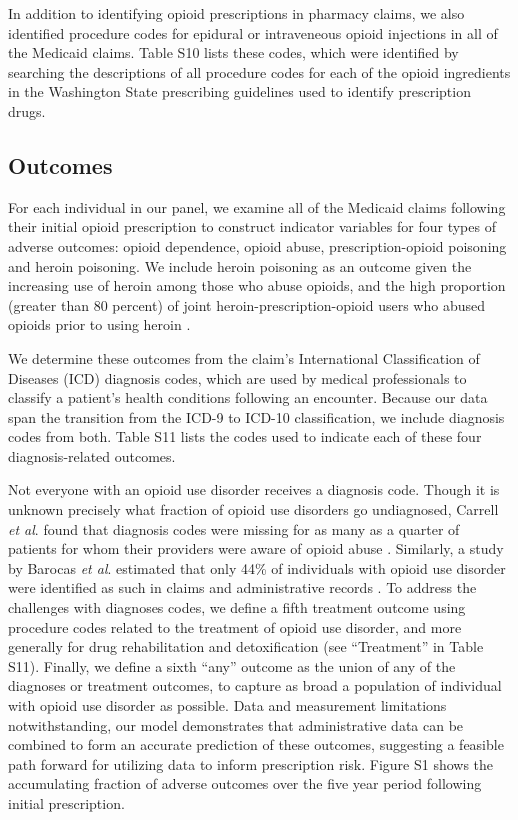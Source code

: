 \documentclass[9pt,twoside]{pnas-new}
\begin{document}
In addition to identifying opioid prescriptions in pharmacy claims, we also identified procedure codes for epidural or intraveneous opioid injections in all of the Medicaid claims. Table S10 lists these codes, which were identified by searching the descriptions of all procedure codes for each of the opioid ingredients in the Washington State prescribing guidelines used to identify prescription drugs.

\subsection{Outcomes}

For each individual in our panel, we examine all of the Medicaid claims following their initial opioid prescription to construct indicator variables for four types of adverse outcomes: opioid dependence, opioid abuse, prescription-opioid poisoning and heroin poisoning. We include heroin poisoning as an outcome given the increasing use of heroin among those who abuse opioids, and the high proportion (greater than 80 percent) of joint heroin-prescription-opioid users who abused opioids prior to using heroin \cite{jones}.

We determine these outcomes from the claim's International Classification of Diseases (ICD) diagnosis codes, which are used by medical professionals to classify a patient's health conditions following an encounter. Because our data span the transition from the ICD-9 to ICD-10 classification, we include diagnosis codes from both. Table S11 lists the codes used to indicate each of these four diagnosis-related outcomes. 

Not everyone with an opioid use disorder receives a diagnosis code. Though it is unknown precisely what fraction of opioid use disorders go undiagnosed, Carrell {\em et al}. found that diagnosis codes were missing for as many as a quarter of patients for whom their providers were aware of opioid abuse \cite{carrell}. Similarly, a study by Barocas {\em et al}. estimated that only 44\% of individuals with opioid use disorder were identified as such in claims and administrative records \cite{barocas}. To address the challenges with diagnoses codes, we define a fifth treatment outcome using procedure codes related to the treatment of opioid use disorder, and more generally for drug rehabilitation and detoxification (see ``Treatment'' in Table S11). Finally, we define a sixth ``any'' outcome as the union of any of the diagnoses or treatment outcomes, to capture as broad a population of individual with opioid use disorder as possible. Data and measurement limitations notwithstanding, our model demonstrates that administrative data can be combined to form an accurate prediction of these outcomes, suggesting a feasible path forward for utilizing data to inform prescription risk. Figure S1 shows the accumulating fraction of adverse outcomes over the five year period following initial prescription.
\end{document}
